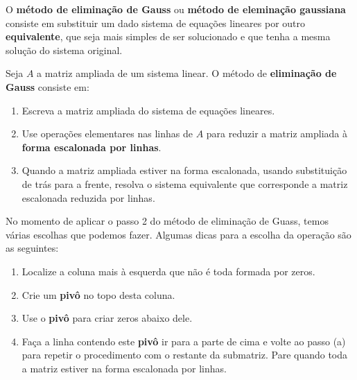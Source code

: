 O \textbf{m\'etodo de elimina\c{c}\~ao de Gauss} ou \textbf{m\'etodo de elemina\c{c}\~ao gaussiana} consiste em substituir um dado sistema de equa\c{c}\~oes lineares  por outro \textbf{equivalente}, que seja mais simples de ser solucionado e que tenha a mesma solu\c{c}\~ao do sistema original.

\begin{definicao}
    Seja $A$ a matriz ampliada de um sistema linear. O m\'etodo de \textbf{elimina\c{c}\~ao de Gauss} consiste em:
    \begin{enumerate}[label={\roman*})]
        \item Escreva a matriz ampliada do sistema de equa\c{c}\~oes lineares.

        \item Use opera\c{c}\~oes elementares nas linhas de $A$ para reduzir a matriz ampliada \`a \textbf{forma escalonada por linhas}.
        
        \item Quando a matriz ampliada estiver na forma escalonada, usando substitui\c{c}\~ao de tr\'as para a frente, resolva o sistema equivalente que corresponde a matriz escalonada reduzida por linhas.
    \end{enumerate}
\end{definicao}

\begin{observacao}
    No momento de aplicar o passo 2 do m\'etodo de elimina\c{c}\~ao de Guass, temos v\'arias escolhas que podemos fazer. Algumas dicas para a escolha da opera\c{c}\~ao s\~ao as seguintes:
    \begin{enumerate}[label=({\alph*})]
        \item Localize a coluna mais \`a esquerda que n\~ao \'e toda formada por zeros.
        
        \item Crie um \textbf{piv\^o} no topo desta coluna.
         
        \item Use o \textbf{piv\^o} para criar zeros abaixo dele.

        \item Fa\c{c}a a linha contendo este \textbf{piv\^o} ir para a parte de cima e volte ao passo (a) para repetir o procedimento com o restante da submatriz. Pare quando toda a matriz estiver na forma escalonada por linhas.
    \end{enumerate}
\end{observacao}

